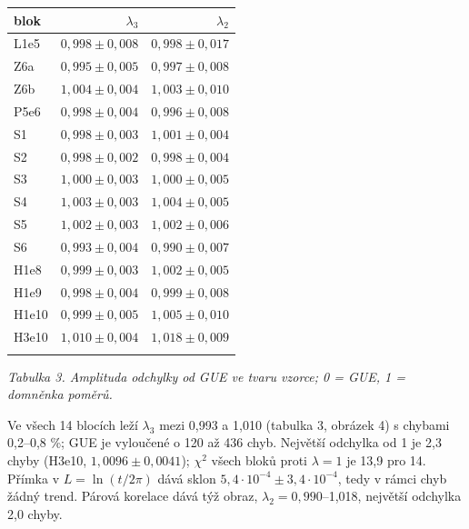 \documentclass[
  10pt,
]{article}
\begin{document}
{\small\begin{longtable}[]{@{}lrr@{}}
\toprule\noalign{}
blok & \(\lambda_3\) & \(\lambda_2\) \\
\midrule\noalign{}
\endhead
\bottomrule\noalign{}
\endlastfoot
L1e5 & \(0{,}998 \pm 0{,}008\) & \(0{,}998 \pm 0{,}017\) \\ \addlinespace[2pt]
Z6a & \(0{,}995 \pm 0{,}005\) & \(0{,}997 \pm 0{,}008\) \\ \addlinespace[2pt]
Z6b & \(1{,}004 \pm 0{,}004\) & \(1{,}003 \pm 0{,}010\) \\ \addlinespace[2pt]
P5e6 & \(0{,}998 \pm 0{,}004\) & \(0{,}996 \pm 0{,}008\) \\ \addlinespace[2pt]
S1 & \(0{,}998 \pm 0{,}003\) & \(1{,}001 \pm 0{,}004\) \\ \addlinespace[2pt]
S2 & \(0{,}998 \pm 0{,}002\) & \(0{,}998 \pm 0{,}004\) \\ \addlinespace[2pt]
S3 & \(1{,}000 \pm 0{,}003\) & \(1{,}000 \pm 0{,}005\) \\ \addlinespace[2pt]
S4 & \(1{,}003 \pm 0{,}003\) & \(1{,}004 \pm 0{,}005\) \\ \addlinespace[2pt]
S5 & \(1{,}002 \pm 0{,}003\) & \(1{,}002 \pm 0{,}006\) \\ \addlinespace[2pt]
S6 & \(0{,}993 \pm 0{,}004\) & \(0{,}990 \pm 0{,}007\) \\ \addlinespace[2pt]
H1e8 & \(0{,}999 \pm 0{,}003\) & \(1{,}002 \pm 0{,}005\) \\ \addlinespace[2pt]
H1e9 & \(0{,}998 \pm 0{,}004\) & \(0{,}999 \pm 0{,}008\) \\ \addlinespace[2pt]
H1e10 & \(0{,}999 \pm 0{,}005\) & \(1{,}005 \pm 0{,}010\) \\ \addlinespace[2pt]
H3e10 & \(1{,}010 \pm 0{,}004\) & \(1{,}018 \pm 0{,}009\) \\ \addlinespace[2pt]
\end{longtable}}

\emph{Tabulka 3. Amplituda odchylky od GUE ve tvaru vzorce; 0 = GUE, 1 =
domněnka poměrů.}

Ve všech 14 blocích leží \(\lambda_3\) mezi 0,993 a 1,010 (tabulka 3,
obrázek 4) s chybami 0,2--0,8 \%; GUE je vyloučené o 120 až 436 chyb.
Největší odchylka od 1 je 2,3 chyby (H3e10, \(1{,}0096 \pm 0{,}0041\));
\(\chi^2\) všech bloků proti \(\lambda = 1\) je 13,9 pro 14. Přímka v
\(L = \ln(t/2\pi)\) dává sklon
\(5{,}4\cdot10^{-4} \pm 3{,}4\cdot10^{-4}\), tedy v rámci chyb žádný
trend. Párová korelace dává týž obraz, \(\lambda_2 = 0{,}990\)--1,018,
největší odchylka 2,0 chyby.
\end{document}
